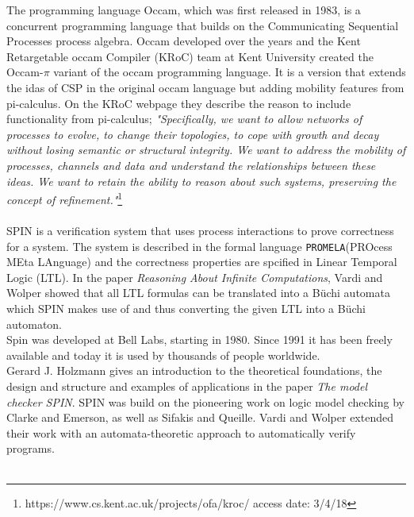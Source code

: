 \documentclass[a4paper]{report}
\begin{document}
The programming language Occam, which was first released in 1983, is a concurrent programming language that builds on the Communicating Sequential Processes process algebra. Occam developed over the years and the Kent Retargetable occam Compiler (KRoC) team at Kent University created the Occam-$\pi$ variant of the occam programming language. It is a version that extends the idas of CSP in the original occam language but adding mobility features from pi-calculus. On the KRoC webpage they describe the reason to include functionality from pi-calculus; \textit{"Specifically, we want to allow networks of processes to evolve, to change their topologies, to cope with growth and decay without losing semantic or structural integrity. We want to address the mobility of processes, channels and data and understand the relationships between these ideas. We want to retain the ability to reason about such systems, preserving the concept of refinement."}\footnote{https://www.cs.kent.ac.uk/projects/ofa/kroc/ access date: 3/4/18}\\\\
SPIN is a verification system that uses process interactions to prove correctness for a system. The system is described in the formal language \texttt{PROMELA}(PROcess MEta LAnguage)\cite{Holzmann1991} and the correctness properties are spcified in Linear Temporal Logic (LTL)\cite{Pnueli1977}. In the paper \textit{Reasoning About Infinite Computations}\cite{Vardi1994}, Vardi and Wolper showed that all LTL formulas can be translated into a B\"uchi automata which SPIN makes use of and thus converting the given LTL into a B\"uchi automaton.\\
Spin was developed at Bell Labs, starting in 1980. Since 1991 it has been freely available and today it is used by thousands of people worldwide.\\Gerard J. Holzmann gives an introduction to the theoretical foundations, the design and structure and examples of applications in the paper \textit{The model checker SPIN}\cite{Holzmann1997}. SPIN was build on the pioneering work on logic model checking by Clarke and Emerson\cite{Clarke1981}, as well as Sifakis and Queille\cite{Queille1982}. Vardi and Wolper extended their work with an automata-theoretic approach to automatically verify programs\cite{Vardi1986}.\\\\
\end{document}
